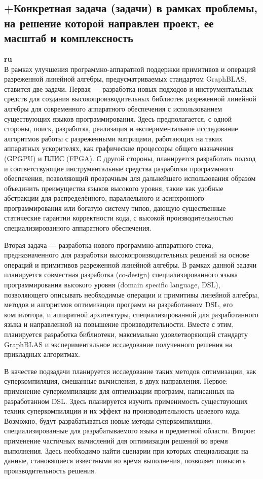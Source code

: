\documentclass[12pt]{article}  %
\theoremstyle{remark}
\begin{document}
\subsection{+Конкретная задача (задачи) в рамках проблемы, на решение которой направлен проект, ее масштаб и комплексность}

\textbf{ru}\\
%
В рамках улучшения программно-аппаратной поддержки примитивов и операций разреженной линейной алгебры, предусматриваемых стандартом GraphBLAS, ставится две задачи. Первая --- разработка новых подходов и инструментальных средств для создания высокопроизводительных библиотек разреженной линейной алгебры для современного аппаратного обеспечения с использованием существующих языков программирования. Здесь предполагается, с одной стороны, поиск, разработка, реализация и экспериментальное исследование алгоритмов работы с разреженными матрицами, работающих на таких аппаратных ускорителях, как графические процессоры общего назначения (GPGPU) и ПЛИС (FPGA). С другой стороны, планируется разработать подход и соответствующие инструментальные средства разработки программного обеспечения, позволяющий прозрачным для дальнейшего использования образом объединить преимущества языков высокого уровня, такие как удобные абстракции для распределённого, параллельного и асинхронного программирования или богатую систему типов, дающую существенные статические гарантии корректности кода, с высокой производительностью специализированного аппаратного обеспечения.  

Вторая задача --- разработка нового программно-аппаратного стека, предназначенного для разработки высокопроизводительных решений на основе операций и примитивов разреженной линейной алгебры. В рамках данной задачи планируется совместная разработка (co-design) специализированного языка программирования высокого уровня (domain specific language, DSL), позволяющего описывать необходимые операции и примитивы линейной алгебры, методов и алгоритмов оптимизации программ на разработанном DSL, его компилятора, и аппаратной архитектуры, специализированной для разработанного языка и направленной на повышение производительности. Вместе с этим, планируется разработка библиотеки, максимально удовлетворяющей стандарту GraphBLAS и экспериментальное исследование полученного решения на прикладных алгоритмах.

В качестве подзадачи планируется исследование таких методов оптимизации, как суперкомпиляция, смешанные вычисления, в двух направления. Первое: применение суперкомпиляции для оптимизации программ, написанных на разработанном DSL. Здесь планируется изучить применимость существующих техник суперкомпиляции и их эффект на производительность целевого кода. Возможно, будут разрабатываться новые методы суперкомпиляции, специализированные для разрабатываемого языка и предметной области. Второе: применение частичных вычислений для оптимизации решений во время выполнения. Здесь необходимо найти сценарии при которых специализация на данные, становящиеся известными во время выполнения, позволяет повысить производительность решения.
\end{document}
